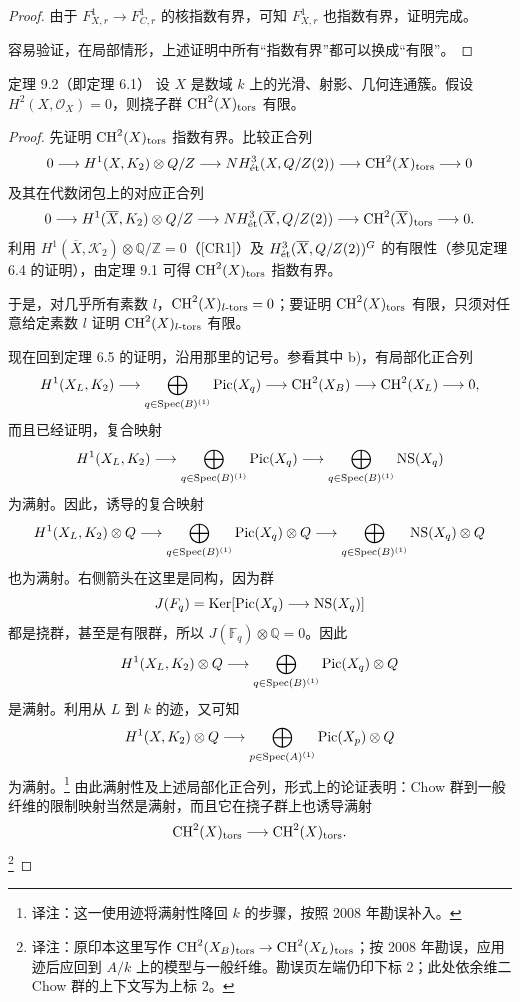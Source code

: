 \begin{proof}
由于 $F_{X,r}^1\to F_{C,r}^1$ 的核指数有界，可知 $F_{X,r}^1$ 也指数有界，证明完成。

容易验证，在局部情形，上述证明中所有“指数有界”都可以换成“有限”。
\end{proof}

\begin{statement}{定理 9.2（即定理 6.1）}
设 $X$ 是数域 $k$ 上的光滑、射影、几何连通簇。假设 $H^2(X,\mathcal O_X)=0$，则挠子群 $\operatorname{CH}^2(X)_{\mathrm{tors}}$ 有限。
\end{statement}
\begin{proof}
先证明 $\operatorname{CH}^2(X)_{\mathrm{tors}}$ 指数有界。比较正合列
\[
 0\longrightarrow H^1(X,K_2)\otimes Q/Z
 \longrightarrow NH^3_{\mathrm{\acute et}}(X,Q/Z(2))
 \longrightarrow\operatorname{CH}^2(X)_{\mathrm{tors}}\longrightarrow0
\]
及其在代数闭包上的对应正合列
\[
 0\longrightarrow H^1(\overline X,K_2)\otimes Q/Z
 \longrightarrow NH^3_{\mathrm{\acute et}}(\overline X,Q/Z(2))
 \longrightarrow\operatorname{CH}^2(\overline X)_{\mathrm{tors}}\longrightarrow0.
\]
利用 $H^1(\overline X,\mathcal K_2)\otimes\mathbb Q/\mathbb Z=0$（[CR1]）及 $H^3_{\mathrm{\acute et}}(\overline X,Q/Z(2))^G$ 的有限性（参见定理 6.4 的证明），由定理 9.1 可得 $\operatorname{CH}^2(X)_{\mathrm{tors}}$ 指数有界。

于是，对几乎所有素数 $l$，$\operatorname{CH}^2(X)_{l\text{-}\mathrm{tors}}=0$；要证明 $\operatorname{CH}^2(X)_{\mathrm{tors}}$ 有限，只须对任意给定素数 $l$ 证明 $\operatorname{CH}^2(X)_{l\text{-}\mathrm{tors}}$ 有限。

现在回到定理 6.5 的证明，沿用那里的记号。参看其中 b)，有局部化正合列
\[
 H^1(X_L,K_2)\longrightarrow
 \bigoplus_{q\in\operatorname{Spec}(B)^{(1)}}\operatorname{Pic}(X_q)
 \longrightarrow\operatorname{CH}^2(X_B)
 \longrightarrow\operatorname{CH}^2(X_L)\longrightarrow0,
\]
而且已经证明，复合映射
\[
 H^1(X_L,K_2)\longrightarrow
 \bigoplus_{q\in\operatorname{Spec}(B)^{(1)}}\operatorname{Pic}(X_q)
 \longrightarrow\bigoplus_{q\in\operatorname{Spec}(B)^{(1)}}\operatorname{NS}(X_q)
\]
为满射。因此，诱导的复合映射
\[
 H^1(X_L,K_2)\otimes Q\longrightarrow
 \bigoplus_{q\in\operatorname{Spec}(B)^{(1)}}\operatorname{Pic}(X_q)\otimes Q
 \longrightarrow\bigoplus_{q\in\operatorname{Spec}(B)^{(1)}}\operatorname{NS}(X_q)\otimes Q
\]
也为满射。右侧箭头在这里是同构，因为群
\[
 J(F_q)=\operatorname{Ker}[\operatorname{Pic}(X_q)\longrightarrow\operatorname{NS}(X_q)]
\]
都是挠群，甚至是有限群，所以 $J(\mathbb F_q)\otimes\mathbb Q=0$。因此
\[
 H^1(X_L,K_2)\otimes Q\longrightarrow
 \bigoplus_{q\in\operatorname{Spec}(B)^{(1)}}\operatorname{Pic}(X_q)\otimes Q
\]
是满射。利用从 $L$ 到 $k$ 的迹，又可知
\[
 H^1(X,K_2)\otimes Q\longrightarrow
 \bigoplus_{p\in\operatorname{Spec}(A)^{(1)}}\operatorname{Pic}(X_p)\otimes Q
\]
为满射。\footnote{译注：这一使用迹将满射性降回 $k$ 的步骤，按照 2008 年勘误补入。}
由此满射性及上述局部化正合列，形式上的论证表明：Chow 群到一般纤维的限制映射当然是满射，而且它在挠子群上也诱导满射
\[
 \operatorname{CH}^2(X)_{\mathrm{tors}}\longrightarrow\operatorname{CH}^2(X)_{\mathrm{tors}}.
\]
\footnote{译注：原印本这里写作 $\operatorname{CH}^2(X_B)_{\mathrm{tors}}\to\operatorname{CH}^2(X_L)_{\mathrm{tors}}$；按 2008 年勘误，应用迹后应回到 $A/k$ 上的模型与一般纤维。勘误页左端仍印下标 $2$；此处依余维二 Chow 群的上下文写为上标 $2$。}


\end{proof}
